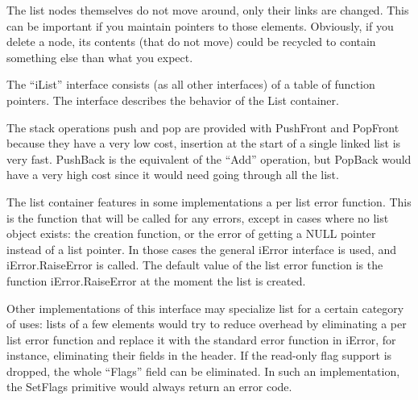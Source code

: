 \documentclass[12pt,a4paper]{memoir} %
\newcommand{\Null}{
{\footnotesize NULL}
}
\begin{document}
The list nodes themselves do not move around, only their links are changed. This can be important if you maintain pointers to those elements. Obviously, if you delete a node, its contents (that do not move) could be recycled to contain something else than what you expect.

The “iList” interface consists (as all other interfaces) of a table of function pointers. The interface describes the behavior of the List container.

The stack operations push and pop are provided with PushFront and PopFront because they have a very low cost, insertion at the start of a single linked list is very fast. PushBack is the equivalent of the “Add” operation, but PopBack would have a very high cost since it would need going through all the list. 

The list container features in some implementations a per list error function.  This is the function that will be called for any errors, except in  cases where no list object exists: the creation function, or the error of getting a\Null pointer instead of a list pointer. In those cases the general iError interface is used, and iError.RaiseError is called. The default value of the list error function is the function iError.RaiseError at the moment the list is created.

Other implementations of this interface may specialize list for a certain category of uses: lists of a few elements would try to reduce overhead by eliminating a per list error function and replace it with the standard error function in iError, for instance, eliminating their fields in the header. If the read-only flag support is dropped, the whole “Flags” field can be eliminated. In such an implementation, the SetFlags primitive would always return an error code.
\end{document}
